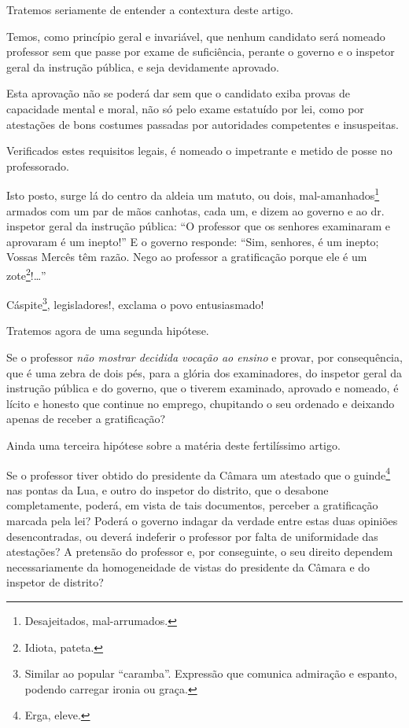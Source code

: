 Tratemos seriamente de entender a contextura deste artigo.

Temos, como princípio geral e invariável, que nenhum candidato será
nomeado professor sem que passe por exame de suficiência, perante o
governo e o inspetor geral da instrução pública, e seja devidamente
aprovado.

Esta aprovação não se poderá dar sem que o candidato exiba provas de
capacidade mental e moral, não só pelo exame estatuído por lei, como por
atestações de bons costumes passadas por autoridades competentes e
insuspeitas.

Verificados estes requisitos legais, é nomeado o impetrante e metido de
posse no professorado.

Isto posto, surge lá do centro da aldeia um matuto, ou dois,
mal-amanhados\footnote{Desajeitados, mal-arrumados.} armados com um
par de mãos canhotas, cada um, e dizem ao governo e ao dr.\,inspetor
geral da instrução pública: ``O professor que os senhores examinaram e
aprovaram é um inepto!'' E o governo responde: ``Sim, senhores, é um
inepto; Vossas Mercês têm razão. Nego ao professor a gratificação porque
ele é um zote\footnote{Idiota, pateta.}!\ldots{}''

Cáspite\footnote{Similar ao popular ``caramba''. Expressão que comunica
  admiração e espanto, podendo carregar ironia ou graça.},
legisladores!, exclama o povo entusiasmado!

Tratemos agora de uma segunda hipótese.

Se o professor \emph{não mostrar decidida vocação ao ensino} e provar,
por consequência, que é uma zebra de dois pés, para a glória dos
examinadores, do inspetor geral da instrução pública e do governo, que o
tiverem examinado, aprovado e nomeado, é lícito e honesto que continue
no emprego, chupitando o seu ordenado e deixando apenas de receber a
gratificação?

Ainda uma terceira hipótese sobre a matéria deste fertilíssimo artigo.

Se o professor tiver obtido do presidente da Câmara um atestado que o
guinde\footnote{Erga, eleve.} nas pontas da Lua, e outro do inspetor
do distrito, que o desabone completamente, poderá, em vista de tais
documentos, perceber a gratificação marcada pela lei? Poderá o governo
indagar da verdade entre estas duas opiniões desencontradas, ou deverá
indeferir o professor por falta de uniformidade das atestações? A
pretensão do professor e, por conseguinte, o seu direito dependem
necessariamente da homogeneidade de vistas do presidente da Câmara e do
inspetor de distrito?

